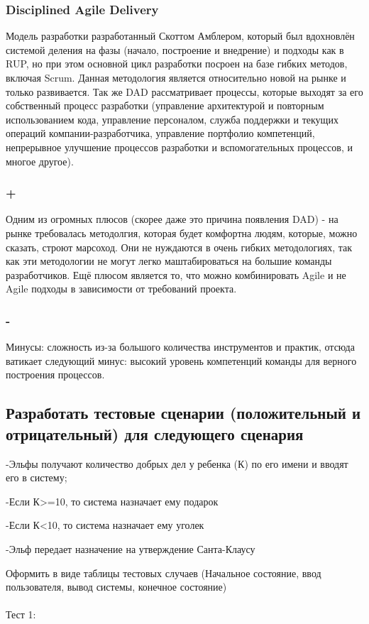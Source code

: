 \documentclass{article}
\begin{document}
\subsubsection{Disciplined Agile Delivery}
Модель разработки разработанный Скоттом Амблером, который был вдохновлён системой деления на фазы (начало, построение и внедрение) и подходы как в RUP, но при этом основной цикл разработки посроен на базе гибких методов, включая Scrum. Данная методология является относительно новой на рынке и только развивается.
Так же DAD рассматривает процессы, которые выходят за его собственный процесс разработки
(управление архитектурой и повторным использованием кода, управление персоналом, служба поддержки и текущих операций компании-разработчика, управление портфолио компетенций, непрерывное улучшение процессов разработки и вспомогательных процессов, и многое другое).
\subsubsection{+}
Одним из огромных плюсов (скорее даже это причина появления DAD) - на рынке требовалась методолгия, которая будет комфортна людям, которые, можно сказать, строют марсоход. Они не нуждаются в очень гибких методологиях, так как эти методологии не могут легко маштабироваться на большие команды разработчиков.
Ещё плюсом является то, что можно комбинировать Agile и не Agile подходы в зависимости от требований проекта.
\subsubsection{-}
Минусы: сложность из-за большого количества инструментов и практик, отсюда ватикает следующий минус: высокий уровень компетенций команды для верного построения процессов.

\subsection[Эльфы и тестовое покрытие]{Разработать тестовые сценарии (положительный и отрицательный) для следующего сценария}

-Эльфы получают количество добрых дел у ребенка (К) по его имени и вводят его в систему;

-Если К>=10, то система назначает ему подарок

-Если К<10, то система назначает ему уголек

-Эльф передает назначение на утверждение Санта-Клаусу

Оформить в виде таблицы тестовых случаев (Начальное состояние, ввод пользователя, вывод системы, конечное состояние)
\\ \\
Тест 1:
\end{document}
